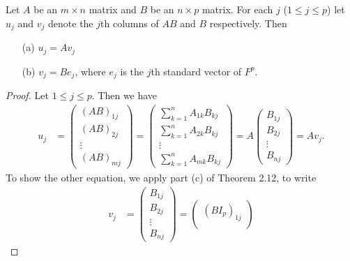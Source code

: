 \begin{theorem}\label{Theorem 2.13} 
   Let \( A  \) be an \( m \times n  \) matrix and \( B  \) be an \( n \times p  \) matrix. For each \( j  \) (\( 1 \leq j \leq p  \)) let \( {u}_{j}  \) and \(  {v}_{j}  \) denote the \( j \)th columns of \( AB  \) and \( B  \) respectively. Then
    \begin{enumerate}
        \item[(a)]  \( {u}_{j} = A {v}_{j}  \)
        \item[(b)] \( {v}_{j} = B {e}_{j }  \), where \( {e}_{j}  \) is the \( j \)th standard vector of \( F^{p} \).
    \end{enumerate}
\end{theorem}

\begin{proof}
Let \( 1 \leq j \leq p  \). Then we have
\begin{align*}
    {u}_{j} &= \begin{pmatrix}
        {(AB)}_{1j } \\
        {(AB)}_{2j } \\
        \vdots \\
        {(AB)}_{mj} 
    \end{pmatrix} = \begin{pmatrix}
        \sum_{ k=1 }^{ n } {A}_{1k} {B}_{kj} \\
        \sum_{ k=1  }^{  n } {A}_{2k } {B}_{kj } \\
        \vdots \\
        \sum_{ k=1 }^{ n } {A}_{mk } {B}_{kj }
    \end{pmatrix} =  A \begin{pmatrix}
        {B}_{1j } \\
        {B}_{2j } \\
        \vdots \\
        {B}_{nj}
    \end{pmatrix} =  A {v}_{j }.
\end{align*}
To show the other equation, we apply part (c) of Theorem 2.12, to write
\begin{align*}
   {v}_{j}  &= \begin{pmatrix}
       {B}_{1j } \\
       {B}_{2j } \\
       \vdots \\
       {B}_{nj } 
   \end{pmatrix} = 
   \begin{pmatrix}
        (B {I}_{p})_{1j} \\  

\end{pmatrix}
\end{align*}
\end{proof}
